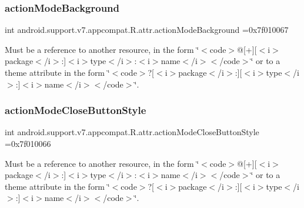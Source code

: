 \subsubsection{\texorpdfstring{action\+Mode\+Background}{actionModeBackground}}
{\footnotesize\ttfamily int android.\+support.\+v7.\+appcompat.\+R.\+attr.\+action\+Mode\+Background =0x7f010067\hspace{0.3cm}{\ttfamily [static]}}

Must be a reference to another resource, in the form \char`\"{}$<$code$>$@\mbox{[}+\mbox{]}\mbox{[}$<$i$>$package$<$/i$>$\+:\mbox{]}$<$i$>$type$<$/i$>$\+:$<$i$>$name$<$/i$>$$<$/code$>$\char`\"{} or to a theme attribute in the form \char`\"{}$<$code$>$?\mbox{[}$<$i$>$package$<$/i$>$\+:\mbox{]}\mbox{[}$<$i$>$type$<$/i$>$\+:\mbox{]}$<$i$>$name$<$/i$>$$<$/code$>$\char`\"{}. \mbox{\label{classandroid_1_1support_1_1v7_1_1appcompat_1_1R_1_1attr_a67dbe021038d6f18acd2b888552074ac}} 
\subsubsection{\texorpdfstring{action\+Mode\+Close\+Button\+Style}{actionModeCloseButtonStyle}}
{\footnotesize\ttfamily int android.\+support.\+v7.\+appcompat.\+R.\+attr.\+action\+Mode\+Close\+Button\+Style =0x7f010066\hspace{0.3cm}{\ttfamily [static]}}

Must be a reference to another resource, in the form \char`\"{}$<$code$>$@\mbox{[}+\mbox{]}\mbox{[}$<$i$>$package$<$/i$>$\+:\mbox{]}$<$i$>$type$<$/i$>$\+:$<$i$>$name$<$/i$>$$<$/code$>$\char`\"{} or to a theme attribute in the form \char`\"{}$<$code$>$?\mbox{[}$<$i$>$package$<$/i$>$\+:\mbox{]}\mbox{[}$<$i$>$type$<$/i$>$\+:\mbox{]}$<$i$>$name$<$/i$>$$<$/code$>$\char`\"{}. \mbox{\label{classandroid_1_1support_1_1v7_1_1appcompat_1_1R_1_1attr_a02eb886de7c9d0c93fe17338af168f46}} 
